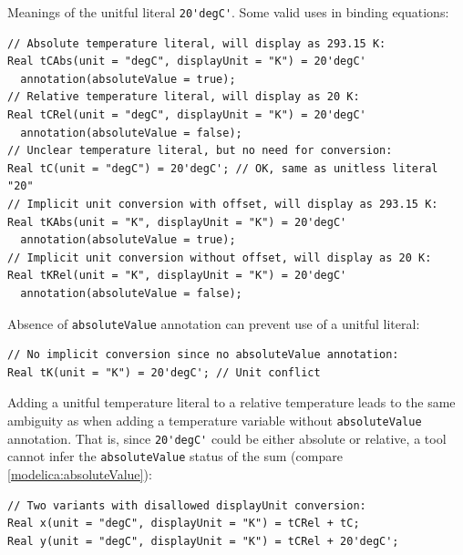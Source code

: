 \begin{example}
Meanings of the unitful literal \lstinline!20'degC'!.
Some valid uses in binding equations:
\begin{lstlisting}[language=modelica]
// Absolute temperature literal, will display as 293.15 K:
Real tCAbs(unit = "degC", displayUnit = "K") = 20'degC'
  annotation(absoluteValue = true);
// Relative temperature literal, will display as 20 K:
Real tCRel(unit = "degC", displayUnit = "K") = 20'degC'
  annotation(absoluteValue = false);
// Unclear temperature literal, but no need for conversion:
Real tC(unit = "degC") = 20'degC'; // OK, same as unitless literal "20"
// Implicit unit conversion with offset, will display as 293.15 K:
Real tKAbs(unit = "K", displayUnit = "K") = 20'degC'
  annotation(absoluteValue = true);
// Implicit unit conversion without offset, will display as 20 K:
Real tKRel(unit = "K", displayUnit = "K") = 20'degC'
  annotation(absoluteValue = false);
\end{lstlisting}

Absence of \lstinline!absoluteValue! annotation can prevent use of a unitful literal:
\begin{lstlisting}[language=modelica]
// No implicit conversion since no absoluteValue annotation:
Real tK(unit = "K") = 20'degC'; // Unit conflict
\end{lstlisting}

Adding a unitful temperature literal to a relative temperature leads to the same ambiguity as when adding a temperature variable without \lstinline!absoluteValue! annotation.
That is, since \lstinline!20'degC'! could be either absolute or relative, a tool cannot infer the \lstinline!absoluteValue! status of the sum (compare \cref{modelica:absoluteValue}):
\begin{lstlisting}[language=modelica]
// Two variants with disallowed displayUnit conversion:
Real x(unit = "degC", displayUnit = "K") = tCRel + tC;
Real y(unit = "degC", displayUnit = "K") = tCRel + 20'degC';
\end{lstlisting}
\end{example}

